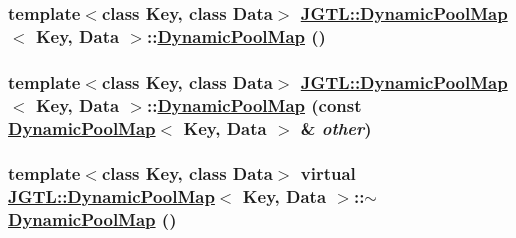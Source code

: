 \hypertarget{class_j_g_t_l_1_1_dynamic_pool_map_07c6425b3ff8be9bb668c187f6431b76}{
\subsubsection[DynamicPoolMap]{\setlength{\rightskip}{0pt plus 5cm}template$<$class Key, class Data$>$ \hyperlink{class_j_g_t_l_1_1_dynamic_pool_map}{JGTL::Dynamic\-Pool\-Map}$<$ Key, Data $>$::\hyperlink{class_j_g_t_l_1_1_dynamic_pool_map}{Dynamic\-Pool\-Map} ()}}
\label{class_j_g_t_l_1_1_dynamic_pool_map_07c6425b3ff8be9bb668c187f6431b76}


\hypertarget{class_j_g_t_l_1_1_dynamic_pool_map_309ac93775245116f166ac406fc192bd}{
\subsubsection[DynamicPoolMap]{\setlength{\rightskip}{0pt plus 5cm}template$<$class Key, class Data$>$ \hyperlink{class_j_g_t_l_1_1_dynamic_pool_map}{JGTL::Dynamic\-Pool\-Map}$<$ Key, Data $>$::\hyperlink{class_j_g_t_l_1_1_dynamic_pool_map}{Dynamic\-Pool\-Map} (const \hyperlink{class_j_g_t_l_1_1_dynamic_pool_map}{Dynamic\-Pool\-Map}$<$ Key, Data $>$ \& {\em other})}}
\label{class_j_g_t_l_1_1_dynamic_pool_map_309ac93775245116f166ac406fc192bd}


\hypertarget{class_j_g_t_l_1_1_dynamic_pool_map_b833361ff8ae724639fb0d4ed9e6392f}{
\subsubsection[$\sim$DynamicPoolMap]{\setlength{\rightskip}{0pt plus 5cm}template$<$class Key, class Data$>$ virtual \hyperlink{class_j_g_t_l_1_1_dynamic_pool_map}{JGTL::Dynamic\-Pool\-Map}$<$ Key, Data $>$::$\sim$\hyperlink{class_j_g_t_l_1_1_dynamic_pool_map}{Dynamic\-Pool\-Map} ()}}
\label{class_j_g_t_l_1_1_dynamic_pool_map_b833361ff8ae724639fb0d4ed9e6392f}




